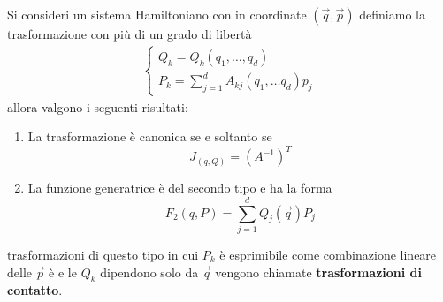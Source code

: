 Si consideri un sistema Hamiltoniano con in coordinate $(\vec{q},\vec{p})$ definiamo la trasformazione con pi\`{u} di un grado di libert\`{a} 
\begin{align}
	\left\{\begin{array}{l}
Q_k=Q_k\left(q_1, \ldots, q_d\right) \\
P_k=\sum_{j=1}^{d} A_{k j}\left(q_1, \ldots q_d\right)p_j
\end{array}\right.
\end{align}
allora valgono i seguenti risultati:
\begin{enumerate}
	\item La trasformazione \`{e} canonica se e soltanto se 
	\begin{equation}
		J_{(q,Q)} = ({A^{-1}})^T
	\end{equation}
	\item La funzione generatrice \`{e} del secondo tipo e ha la forma
	\begin{equation}
		F_2(q,P) = \sum_{j=1}^d Q_j(\vec{q})P_j
	\end{equation}
\end{enumerate}
trasformazioni di questo tipo in cui $P_k$ \`{e} esprimibile come combinazione lineare delle $\vec{p}$ \`{e} e le $Q_k$ dipendono solo da $\vec{q}$ vengono chiamate \textbf{trasformazioni di contatto}.
